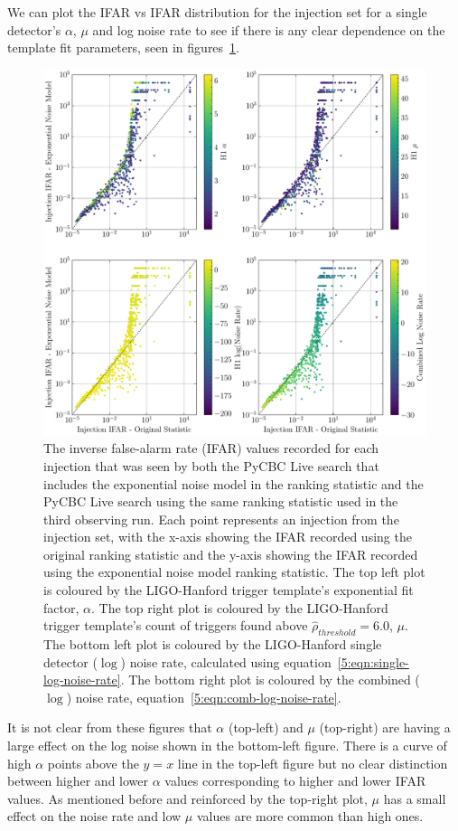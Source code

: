We can plot the IFAR vs IFAR distribution for the injection set for a single detector's $\alpha$, $\mu$ and log noise rate to see if there is any clear dependence on the template fit parameters, seen in figures~\ref{5:fig:ifar-ifar-subplots}.
%
\begin{figure}
    \centering
    \includegraphics[width=\textwidth]{images/5_pycbclive/fits-only/fits_only_ifar_vs_ifar_subplots.pdf}
    \caption{The inverse false-alarm rate (IFAR) values recorded for each injection that was seen by both the PyCBC Live search that includes the exponential noise model in the ranking statistic and the PyCBC Live search using the same ranking statistic used in the third observing run. Each point represents an injection from the injection set, with the x-axis showing the IFAR recorded using the original ranking statistic and the y-axis showing the IFAR recorded using the exponential noise model ranking statistic. The top left plot is coloured by the LIGO-Hanford trigger template's exponential fit factor, $\alpha$. The top right plot is coloured by the LIGO-Hanford trigger template's count of triggers found above $\hat{\rho}_{threshold} = 6.0$, $\mu$. The bottom left plot is coloured by the LIGO-Hanford single detector ($\log$) noise rate, calculated using equation~\ref{5:eqn:single-log-noise-rate}. The bottom right plot is coloured by the combined ($\log$) noise rate, equation~\ref{5:eqn:comb-log-noise-rate}.}
    \label{5:fig:ifar-ifar-subplots}
\end{figure}
%
It is not clear from these figures that $\alpha$ (top-left) and $\mu$ (top-right) are having a large effect on the log noise shown in the bottom-left figure. There is a curve of high $\alpha$ points above the $y=x$ line in the top-left figure but no clear distinction between higher and lower $\alpha$ values corresponding to higher and lower IFAR values. As mentioned before and reinforced by the top-right plot, $\mu$ has a small effect on the noise rate and low $\mu$ values are more common than high ones.

